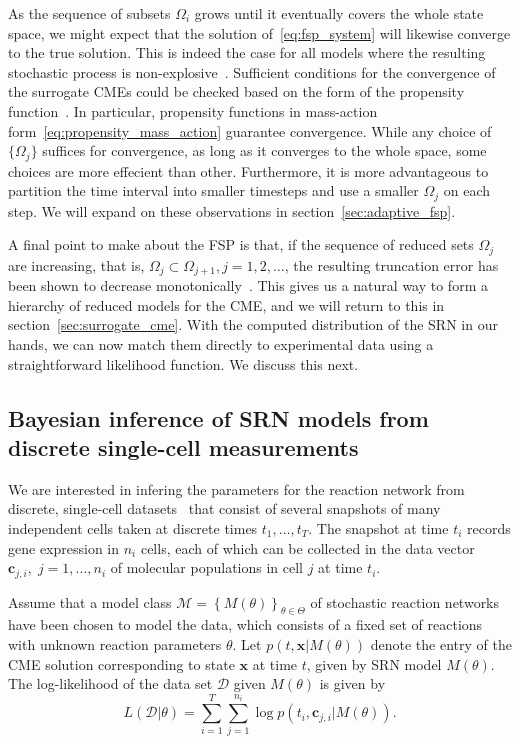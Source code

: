 \documentclass[1p]{article}
\def\bx{\bm{x}}
\begin{document}
As the sequence of subsets $\Omega_i$ grows until it eventually covers the whole state space, we might expect that the solution of~\eqref{eq:fsp_system} will likewise converge to the true solution. This is indeed the case for all models where the resulting stochastic process is non-explosive~\cite{Munsky2006}. Sufficient conditions for the convergence of the surrogate CMEs could be checked based on the form of the propensity function~\cite{Gauckler2014, Gupta2014}. In particular, propensity functions in mass-action form~\eqref{eq:propensity_mass_action} guarantee convergence.
While any choice of $\{\Omega_j\}$ suffices for convergence, as long as it converges to the whole space, some choices are more effecient than other.
Furthermore, it is more advantageous to partition the time interval into smaller timesteps and use a smaller $\Omega_j$ on each step.
We will expand on these observations in section~\ref{sec:adaptive_fsp}.

A final point to make about the FSP is that, if the sequence of reduced sets $\Omega_j$ are increasing, that is, $\Omega_j \subset \Omega_{j+1}, j=1,2,\ldots$, the resulting truncation error has been shown to decrease monotonically~\cite[Theorem 2.1]{Munsky2006}. This gives us a natural way to form a hierarchy of reduced models for the CME, and we will return to this in section~\ref{sec:surrogate_cme}. With the computed distribution of the SRN in our hands, we can now match them directly to experimental data using a straightforward likelihood function. We discuss this next.
\subsection{Bayesian inference of SRN models from discrete single-cell measurements}
We are interested in infering the parameters for the reaction network from discrete, single-cell datasets~\cite{Femino1998,Raj2008,munsky_science,BayesFISH2017} that consist of several snapshots of many independent cells taken at discrete times $t_1,\ldots, t_T$. The snapshot at time $t_i$ records gene expression in $n_i$ cells, each of which can be collected in the data vector $\bm{c}_{j,i}, \; j = 1,\ldots, n_i$ of molecular populations in cell $j$ at time $t_i$.

Assume that a model class $\mathcal{M} = \left\{M(\theta)\right\}_{\theta \in \Theta}$ of stochastic reaction networks have been chosen to model the data, which consists of a fixed set of reactions with unknown reaction parameters $\theta$.
Let $p(t, \bm{x} | M(\theta))$ denote the entry of the CME solution corresponding to state $\bx$ at time $t$, given by SRN model $M(\theta)$.
The log-likelihood of the data set $\mathcal{D}$ given $M(\theta)$ is given by
\begin{equation}
  \label{eq:full_logl}
  {L}(\mathcal{D} \vert \theta)
  =
  \sum_{i=1}^{T}
  \sum_{j=1}^{n_i}
  {\log{p(t_i, \bm{c}_{j,i} | M(\theta))}}.
\end{equation}
\end{document}
